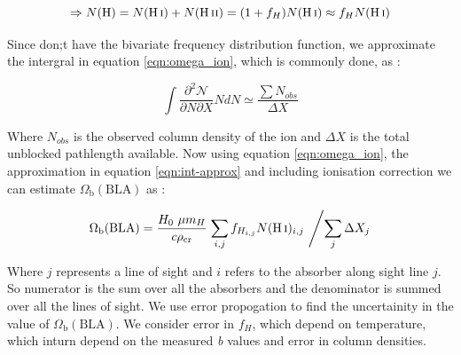 \begin{equation*}
     \Rightarrow  N(\text{H}) = N(\ion{H}{i})+N(\ion{H}{ii}) = (1+f_H)N(\ion{H}{i}) \approx f_H N(\ion{H}{i})
\end{equation*}

Since don;t have the bivariate frequency distribution function, we approximate the intergral in equation \ref{eqn:omega_ion}, which is commonly done, as : 

\begin{equation} \label{eqn:int-approx}
    \int \frac{\partial ^2 \mathcal{N}}{\partial N  \partial X} N dN \simeq \frac{\sum N_{obs}}{\Delta X} 
\end{equation}

Where $N_{obs}$ is the observed column density of the ion and $\Delta X$ is the total unblocked pathlength available. Now using equation \ref{eqn:omega_ion}, the approximation in equation \ref{eqn:int-approx} and including ionisation correction we can estimate $\Omega_\text{b}(\text{BLA})$ as :

\begin{equation}
    \Omega_\text{b}(\text{BLA}) = \frac{H_0 \ \mu m_H}{c \rho_{\text{cr}}} \left. \sum_{i,j} f_{H_{i,j}} N(\ion{H}{i})_{i,j} \ \middle / \sum_j \Delta X_j \right.
\end{equation}

Where $j$ represents a line of sight and $i$ refers to the absorber along sight line $j$. So numerator is the sum over all the absorbers and the denominator is summed over all the lines of sight.  We use error propogation to find the uncertainity in the value of $\Omega_\text{b}(\text{BLA})$. We consider error in $f_H$, which depend on temperature, which inturn depend on the measured \emph{b} values and error in  column densities.  


 
